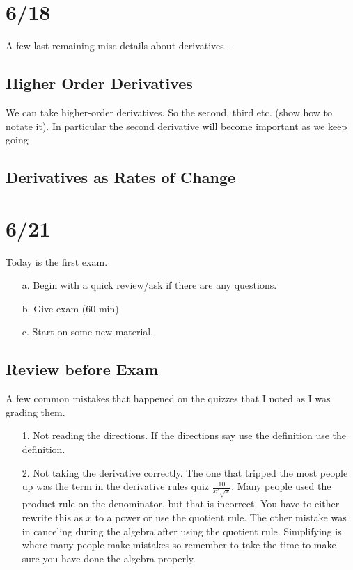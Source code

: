 \documentclass[12pt,reqno]{article}
\theoremstyle{definition}
\begin{document}
\section{6/18}

A few last remaining misc details about derivatives - 

\subsection{Higher Order Derivatives} We can take higher-order derivatives. So the second, third etc. (show how to notate it). In particular the second derivative will become important as we keep going 
\subsection{Derivatives as Rates of Change} 

\section{6/21}

Today is the first exam. 
\begin{enumerate}
	\item[a.] Begin with a quick review/ask if there are any questions. 
	\item[b.] Give exam (60 min)
	\item[c.] Start on some new material.
\end{enumerate}

\subsection{Review before Exam}

A few common mistakes that happened on the quizzes that I noted as I was grading them. 

\begin{enumerate}
	\item[1.] Not reading the directions. If the directions say use the definition use the definition. 
	\item[2.] Not taking the derivative correctly. The one that tripped the most people up was the term in the derivative rules quiz $\frac{10}{x^2 \sqrt{x}}$. Many people used the product rule on the denominator, but that is incorrect. You have to either rewrite this as $x$ to a power or use the quotient rule. The other mistake was in canceling during the algebra after using the quotient rule. Simplifying is where many people make mistakes so remember to take the time to make sure you have done the algebra properly. 
\end{enumerate}
\end{document}
